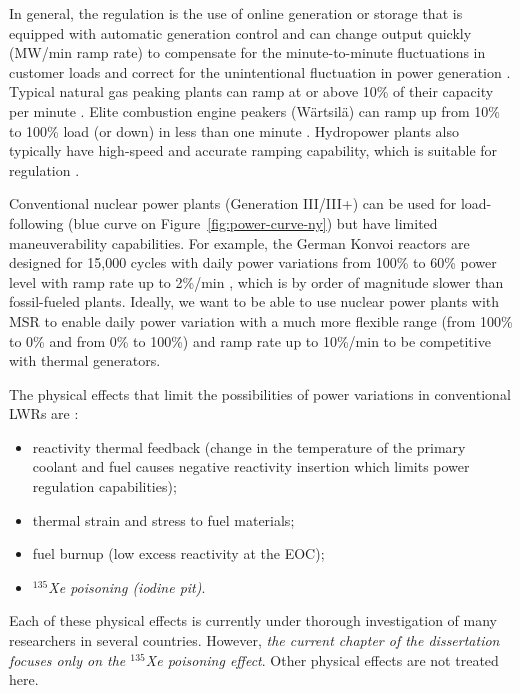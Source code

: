 In general, the regulation is the use of online generation or storage that is 
equipped with automatic generation control and can change output 
quickly (MW/min ramp rate) to compensate for the minute-to-minute 
fluctuations in customer loads and correct for the unintentional fluctuation 
in power generation \cite{kirby_method_2005}. Typical natural gas peaking 
plants can ramp at or above 10\% of their capacity per minute 
\cite{huff_enabling_2018}. Elite combustion engine peakers (W\"{a}rtsil\"{a}) 
can ramp up from 10\% to 100\% load (or down) in less than one minute 
\cite{wartsila_combustion_2020}. Hydropower plants also typically have
high-speed and accurate ramping capability, which is suitable for regulation 
\cite{kirby_method_2005}.

Conventional nuclear power plants (Generation III/III+) can be used for 
load-following (blue curve on Figure~\ref{fig:power-curve-ny}) but have 
limited maneuverability capabilities. For example, the German Konvoi reactors 
are designed for 15,000 cycles with daily power variations from 100\% to 60\% 
power level with ramp rate up to 2\%/min \cite{ludwig_load_2011}, which is by 
order of magnitude slower than fossil-fueled plants. Ideally, we want to be 
able to use nuclear power plants with \gls{MSR} to enable daily power 
variation with a much more flexible range (from 100\% to 0\% and from 0\% to 
100\%) and ramp rate up to 10\%/min to be competitive with thermal generators.

The physical effects that limit the possibilities of power variations in 
conventional \glspl{LWR} are \cite{lokhov_technical_2011}:
\begin{itemize}[noitemsep, topsep=0pt]
	\item reactivity thermal feedback (change in the temperature of the 
	primary coolant and fuel causes negative reactivity insertion which limits 
	power regulation capabilities);
	\item thermal strain and stress to fuel materials;
	\item fuel burnup (low excess reactivity at the \gls{EOC});
	\item \emph{$^{135}$Xe poisoning (iodine pit)}.
\end{itemize}
Each of these physical effects is currently under 
thorough investigation of many researchers in several countries. However, 
\emph{the current chapter of the dissertation focuses only on the $^{135}$Xe  
poisoning effect}. Other physical effects are not treated here.

